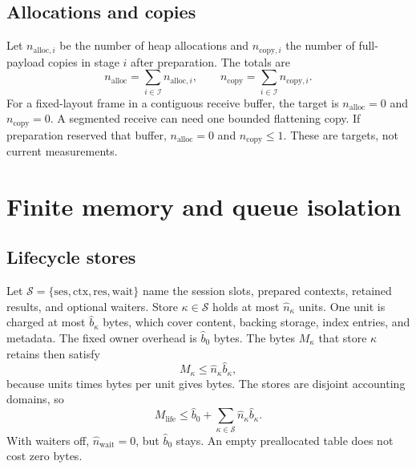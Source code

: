 \documentclass[11pt,a4paper]{article}
\theoremstyle{definition}
\begin{document}
\subsection{Allocations and copies}

Let $n_{\mathrm{alloc},i}$ be the number of heap allocations and $n_{\mathrm{copy},i}$
the number of full-payload copies in stage $i$ after preparation. The totals are
\begin{equation}\label{eq:alloc-copy}
n_{\mathrm{alloc}}=\sum_{i\in\mathcal{I}}n_{\mathrm{alloc},i},\qquad
n_{\mathrm{copy}}=\sum_{i\in\mathcal{I}}n_{\mathrm{copy},i}.
\end{equation}
For a fixed-layout frame in a contiguous receive buffer, the target is
$n_{\mathrm{alloc}}=0$ and $n_{\mathrm{copy}}=0$. A segmented receive can need one
bounded flattening copy. If preparation reserved that buffer, $n_{\mathrm{alloc}}=0$ and
$n_{\mathrm{copy}}\leq1$. These are targets, not current measurements.

\section{Finite memory and queue isolation}


\subsection{Lifecycle stores}

Let $\mathcal{S}=\{\mathrm{ses},\mathrm{ctx},\mathrm{res},\mathrm{wait}\}$ name the
session slots, prepared contexts, retained results, and optional waiters. Store
$\kappa\in\mathcal{S}$ holds at most $\hat n_\kappa$ units. One unit is charged at most
$\hat b_\kappa$ bytes, which cover content, backing storage, index entries, and
metadata. The fixed owner overhead is $\hat b_0$ bytes. The bytes $M_\kappa$ that store
$\kappa$ retains then satisfy
\begin{equation}\label{eq:store-bound}
M_\kappa\leq\hat n_\kappa\hat b_\kappa,
\end{equation}
because units times bytes per unit gives bytes. The stores are disjoint accounting
domains, so
\begin{equation}\label{eq:lifecycle-memory}
M_{\mathrm{life}}\leq\hat b_0+\sum_{\kappa\in\mathcal{S}}\hat n_\kappa\hat b_\kappa.
\end{equation}
With waiters off, $\hat n_{\mathrm{wait}}=0$, but $\hat b_0$ stays. An empty
preallocated table does not cost zero bytes.
\end{document}
